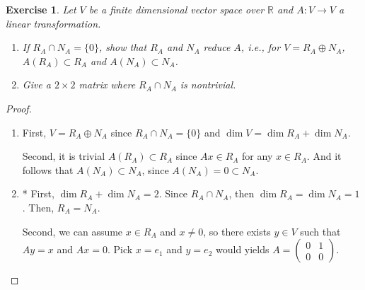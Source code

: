 \documentclass[11pt]{book}
\newtheorem{exercise}{Exercise}[section]
\theoremstyle{definition}
\numberwithin{equation}{chapter}
\begin{document}
\begin{exercise}
Let $V$ be a finite dimensional vector space over $\mathbb{R}$ and $A: V \to V$ a linear transformation.
\begin{enumerate}[label=(\alph*)]
    \item If $R_A \cap N_A = \{0\}$, show that $R_A$ and $N_A$ reduce $A$, i.e., for $V = R_A \oplus N_A$, $A(R_A) \subset R_A$ and $A(N_A) \subset N_A$.
    
    \item Give a $2 \times 2$ matrix where $R_A \cap N_A$ is nontrivial.
\end{enumerate}
\end{exercise}
\begin{proof}
~\begin{enumerate}[label=(\alph*)]
    \item First, $V = R_A \oplus N_A$ since $R_A \cap N_A = \{0\}$ and $\dim V = \dim R_A + \dim N_A$.
    
    Second, it is trivial $A(R_A) \subset R_A$ since $Ax \in R_A$ for any $x \in R_A$. And it follows that $A(N_A) \subset N_A$, since $A(N_A) = 0 \subset N_A$.
    
    \item* First, $\dim R_A + \dim N_A = 2$. Since $R_A \cap N_A$, then $\dim R_A = \dim N_A = 1$. Then, $R_A = N_A$.
    
    Second, we can assume $x \in R_A$ and $x \neq 0$, so there exists $y \in V$ such that $Ay = x$ and $Ax = 0$. Pick $x = e_1$ and $y = e_2$ would yields $A = \begin{pmatrix} 0 & 1 \\ 0 & 0 \end{pmatrix}$.
\end{enumerate}
\end{proof}

\medskip
\end{document}
